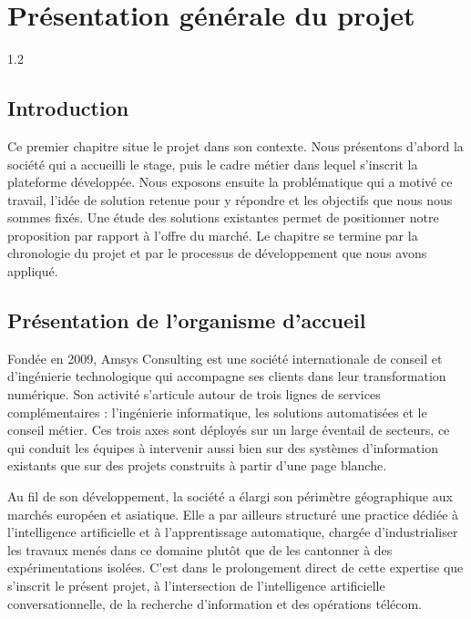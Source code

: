 \chapter{Présentation générale du projet}

\begin{spacing}{1.2}
\minitoc
\thispagestyle{MyStyle}
\end{spacing}
\newpage

\section*{Introduction}

Ce premier chapitre situe le projet dans son contexte. Nous présentons d'abord la société qui a accueilli le stage, puis le cadre métier dans lequel s'inscrit la plateforme développée. Nous exposons ensuite la problématique qui a motivé ce travail, l'idée de solution retenue pour y répondre et les objectifs que nous nous sommes fixés. Une étude des solutions existantes permet de positionner notre proposition par rapport à l'offre du marché. Le chapitre se termine par la chronologie du projet et par le processus de développement que nous avons appliqué.

\section{Présentation de l'organisme d'accueil}

Fondée en 2009, Amsys Consulting est une société internationale de conseil et d'ingénierie technologique qui accompagne ses clients dans leur transformation numérique. Son activité s'articule autour de trois lignes de services complémentaires : l'ingénierie informatique, les solutions automatisées et le conseil métier. Ces trois axes sont déployés sur un large éventail de secteurs, ce qui conduit les équipes à intervenir aussi bien sur des systèmes d'information existants que sur des projets construits à partir d'une page blanche.

Au fil de son développement, la société a élargi son périmètre géographique aux marchés européen et asiatique. Elle a par ailleurs structuré une practice dédiée à l'intelligence artificielle et à l'apprentissage automatique, chargée d'industrialiser les travaux menés dans ce domaine plutôt que de les cantonner à des expérimentations isolées. C'est dans le prolongement direct de cette expertise que s'inscrit le présent projet, à l'intersection de l'intelligence artificielle conversationnelle, de la recherche d'information et des opérations télécom.

